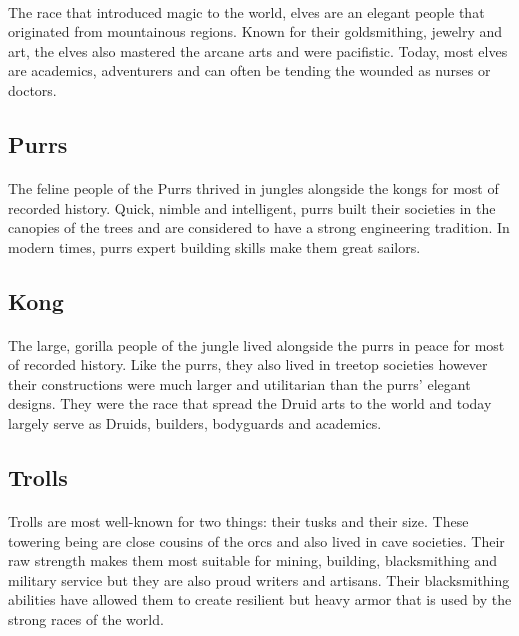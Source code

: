\paragraph{} The race that introduced magic to the world, elves are an elegant people that originated from mountainous regions. Known for their goldsmithing, jewelry and art, the elves also mastered the arcane arts and were pacifistic. Today, most elves are academics, adventurers and can often be tending the wounded as nurses or doctors.

\subsection{Purrs}

\paragraph{} The feline people of the Purrs thrived in jungles alongside the kongs for most of recorded history. Quick, nimble and intelligent, purrs built their societies in the canopies of the trees and are considered to have a strong engineering tradition. In modern times, purrs expert building skills make them great sailors.

\subsection{Kong}

\paragraph{} The large, gorilla people of the jungle lived alongside the purrs in peace for most of recorded history. Like the purrs, they also lived in treetop societies however their constructions were much larger and utilitarian than the purrs' elegant designs. They were the race that spread the Druid arts to the world and today largely serve as Druids, builders, bodyguards and academics.

\subsection{Trolls}

\paragraph{} Trolls are most well-known for two things: their tusks and their size. These towering being are close cousins of the orcs and also lived in cave societies. Their raw strength makes them most suitable for mining, building, blacksmithing and military service but they are also proud writers and artisans. Their blacksmithing abilities have allowed them to create resilient but heavy armor that is used by the strong races of the world.

